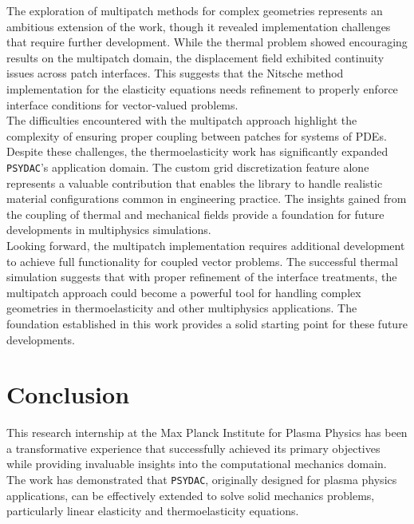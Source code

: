 \documentclass[a4paper,12pt,twoside]{report}
\begin{document}
The exploration of multipatch methods for complex geometries represents an ambitious extension of the work, though it revealed implementation challenges that require further development. While the thermal problem showed encouraging results on the multipatch domain, the displacement field exhibited continuity issues across patch interfaces. This suggests that the Nitsche method implementation for the elasticity equations needs refinement to properly enforce interface conditions for vector-valued problems. \\

The difficulties encountered with the multipatch approach highlight the complexity of ensuring proper coupling between patches for systems of PDEs.
Despite these challenges, the thermoelasticity work has significantly expanded \texttt{PSYDAC}'s application domain. The custom grid discretization feature alone represents a valuable contribution that enables the library to handle realistic material configurations common in engineering practice. The insights gained from the coupling of thermal and mechanical fields provide a foundation for future developments in multiphysics simulations. \\

Looking forward, the multipatch implementation requires additional development to achieve full functionality for coupled vector problems. The successful thermal simulation suggests that with proper refinement of the interface treatments, the multipatch approach could become a powerful tool for handling complex geometries in thermoelasticity and other multiphysics applications. The foundation established in this work provides a solid starting point for these future developments.

\chapter{Conclusion}
\vspace{-1cm}
This research internship at the Max Planck Institute for Plasma Physics has been a transformative experience that successfully achieved its primary objectives while providing invaluable insights into the computational mechanics domain. The work has demonstrated that \texttt{PSYDAC}, originally designed for plasma physics applications, can be effectively extended to solve solid mechanics problems, particularly linear elasticity and thermoelasticity equations.
\end{document}
